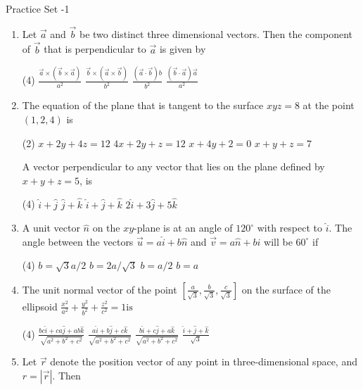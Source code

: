 \newpage
\pagestyle{plain}
\begin{abox}
	Practice Set -1
\end{abox}	
\begin{enumerate}[label=\color{ocre}\textbf{\arabic*.}]
		\item Let $\vec{a}$ and $\vec{b}$ be two distinct three dimensional vectors. Then the component of $\vec{b}$ that is perpendicular to $\vec{a}$ is given by
	{}
	\begin{tasks}(4)
		\task[\textbf{A.}] $\frac{\vec{a} \times(\vec{b} \times \vec{a})}{a^{2}}$
		\task[\textbf{B.}] $\frac{\vec{b} \times(\vec{a} \times \vec{b})}{b^{2}}$
		\task[\textbf{C.}] $\frac{(\vec{a} \cdot \vec{b}) b}{b^{2}}$
		\task[\textbf{D.}] $\frac{(\vec{b} \cdot \vec{a}) \vec{a}}{a^{2}}$
	\end{tasks}
\item The equation of the plane that is tangent to the surface $x y z=8$ at the point $(1,2,4)$ is
{}

\begin{tasks}(2)
	\task[\textbf{A.}] $x+2 y+4 z=12$
	\task[\textbf{B.}] $4 x+2 y+z=12$
	\task[\textbf{C.}] $x+4 y+2=0$
	\task[\textbf{D.}] $x+y+z=7$
\end{tasks}
A vector perpendicular to any vector that lies on the plane defined by $x+y+z=5$, is
{}
\begin{tasks}(4)
	\task[\textbf{A.}] $\hat{i}+\hat{j}$
	\task[\textbf{B.}] $\hat{j}+\hat{k}$
	\task[\textbf{C.}] $\hat{i}+\hat{j}+\hat{k}$
	\task[\textbf{D.}] $2 \hat{i}+3 \hat{j}+5 \hat{k}$
\end{tasks}
	\item A unit vector $\hat{n}$ on the $x y$-plane is at an angle of $120^{\circ}$ with respect to $\hat{i}$. The angle between the vectors $\vec{u}=a \hat{i}+b \hat{n}$ and $\vec{v}=a \hat{n}+b \hat{i}$ will be $60^{\circ}$ if
{}
\begin{tasks}(4)
	\task[\textbf{A.}] $b=\sqrt{3} a / 2$
	\task[\textbf{B.}] $b=2 a / \sqrt{3}$
	\task[\textbf{C.}] $b=a / 2$
	\task[\textbf{D.}] $b=a$
\end{tasks}
	\item The unit normal vector of the point $\left[\frac{a}{\sqrt{3}}, \frac{b}{\sqrt{3}}, \frac{c}{\sqrt{3}}\right]$ on the surface of the ellipsoid $\frac{x^{2}}{a^{2}}+\frac{y^{2}}{b^{2}}+\frac{z^{2}}{c^{2}}=1 \mathrm{is}$
{}

\begin{tasks}(4)
	\task[\textbf{A.}] $\frac{b c \hat{i}+c a \hat{j}+a b \hat{k}}{\sqrt{a^{2}+b^{2}+c^{2}}}$
	\task[\textbf{B.}] $\frac{a \hat{i}+b \hat{j}+c \hat{k}}{\sqrt{a^{2}+b^{2}+c^{2}}}$
	\task[\textbf{C.}] $\frac{b \hat{i}+c \hat{j}+a \hat{k}}{\sqrt{a^{2}+b^{2}+c^{2}}}$
	\task[\textbf{D.}] $\frac{\hat{i}+\hat{j}+\hat{k}}{\sqrt{3}}$
\end{tasks}
\item Let $\vec{r}$ denote the position vector of any point in three-dimensional space, and $r=|\vec{r}|$. Then
{	}


\end{enumerate}
